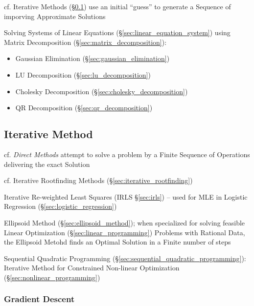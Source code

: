 cf. Iterative Methods (\S\ref{sec:iterative_method}) use an initial ``guess'' to
generate a Sequence of imporving Approximate Solutions

Solving Systems of Linear Equations (\S\ref{sec:linear_equation_system})
using Matrix Decomposition (\S\ref{sec:matrix_decomposition}):
\begin{itemize}
  \item Gaussian Elimination (\S\ref{sec:gaussian_elimination})
  \item LU Decomposition (\S\ref{sec:lu_decomposition})
  \item Cholesky Decomposition (\S\ref{sec:cholesky_decomposition})
  \item QR Decomposition (\S\ref{sec:qr_decomposition})
\end{itemize}



\subsection{Iterative Method}\label{sec:iterative_method}

cf. \emph{Direct Methods} attempt to solve a problem by a Finite Sequence of
Operations delivering the exact Solution

\fist cf. Iterative Rootfinding Methods (\S\ref{sec:iterative_rootfinding})

\fist Iterative Re-weighted Least Squares (IRLS \S\ref{sec:irls}) -- used for
MLE in Logistic Regression (\S\ref{sec:logistic_regression})

\fist Ellipsoid Method (\S\ref{sec:ellipsoid_method}); when specialized for
solving feasible Linear Optimization (\S\ref{sec:linear_programming}) Problems
with Rational Data, the Ellipsoid Metohd finds an Optimal Solution in a Finite
number of steps

\fist Sequential Quadratic Programming
(\S\ref{sec:sequential_quadratic_programming}): Iterative Method for
Constrained Non-linear Optimization (\S\ref{sec:nonlinear_programming})



\subsubsection{Gradient Descent}\label{sec:gradient_descent}

